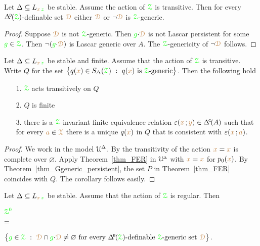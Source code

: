 \begin{corollary}\label{corol_genericornotgeneric}
  Let $\Delta\subseteq L_{{\color{brown} x}\,{\color{green} z}}$ be stable.
  Assume the action of ${\color{green}\EuScript Z}$ is transitive.
  Then for every $\BDelta(\grZ)$-definable set ${\color{brown}\EuScript D}$ either ${\color{brown}\EuScript D}$ or $\neg{\color{brown}\EuScript D}$ is ${\color{green}\EuScript Z}$-generic.
\end{corollary}

\begin{proof}
  Suppose ${\color{brown}\EuScript D}$ is not ${\color{green}\EuScript Z}$-generic.
  Then ${\color{green} g}{\cdot}{\color{brown}\EuScript D}$ is not Lascar persistent for some ${\color{green} g}\in{\color{green}\EuScript Z}$.
  Then $\neg({\color{green} g}{\cdot}{\color{brown}\EuScript D})$ is Lascar generic over $A$.
  The ${\color{green}\EuScript Z}$-genericity of $\neg{\color{brown}\EuScript D}$ follows.
\end{proof}

\begin{corollary}\label{corol_feq_thm}
  Let $\Delta\subseteq L_{{\color{brown} x}\,{\color{green} z}}$ be stable and finite.
  Assume that the action of ${\color{green}\EuScript Z}$ is transitive.
  Write $Q$ for the set $\big\{q({\color{brown} x})\in S_\Delta({\color{green}\EuScript Z})\ :\ q({\color{brown} x})\textrm{ is }{\color{green}\EuScript Z}\textrm{-generic}\big\}$.
  Then the following hold
  \begin{itemize}
    \item [1.] ${\color{green}\EuScript Z}$ acts transitively on $Q$
    \item [2.] $Q$ is finite
    \item [3.] there is a ${\color{green}\EuScript Z}$-invariant finite equivalence relation $\epsilon({\mr x}\,;{\mr y})\in\GDelta(A)$ such that for every ${\color{brown} a}\in{\color{brown}\EuScript X}$ there is a unique $q({\color{brown} x})$ in $Q$ that is consistent with $\varepsilon({\color{brown} x}\,;{\color{brown} a})$.
  \end{itemize}
\end{corollary}

\begin{proof}
  We work in the model $\EuScript U^\Delta$.
  By the transitivity of the action ${\color{brown} x}={\color{brown} x}$ is complete over $\varnothing$.
  Apply Theorem~\ref{thm_FER} in $\EuScript U\kern-.2ex^{\scriptscriptstyle\Delta}$ with ${\color{brown} x}={\color{brown} x}$ for $p_0({\color{brown} x})$.
  By Theorem~\ref{thm_Ggeneric_persistent}, the set $P$ in Theorem~\ref{thm_FER} coincides with $Q$.
  The corollary follows easily.
\end{proof}


\def\medrel#1{\parbox[t]{6ex}{$\displaystyle\hfil #1$}}
\def\ceq#1#2#3{\parbox{5ex}{$\displaystyle #1$}\medrel{#2}$\displaystyle  #3$}
\begin{proposition}
  Let $\Delta\subseteq L_{{\color{brown} x}\,{\color{green} z}}$ be stable.
  Assume that the action of ${\color{green}\EuScript Z}$ is regular.
  Then

  \ceq{\hfill{\gr\Z^0}}{=}{\big\{{\gr g}\in\grZ\ :\ \mrD\cap{\gr g}{\cdot}\mrD\neq\varnothing\textrm{ for every }\BDelta(\grZ)\textrm{-definable }\grZ\textrm{-generic set }\mrD\big\}}.
 
\end{proposition}

